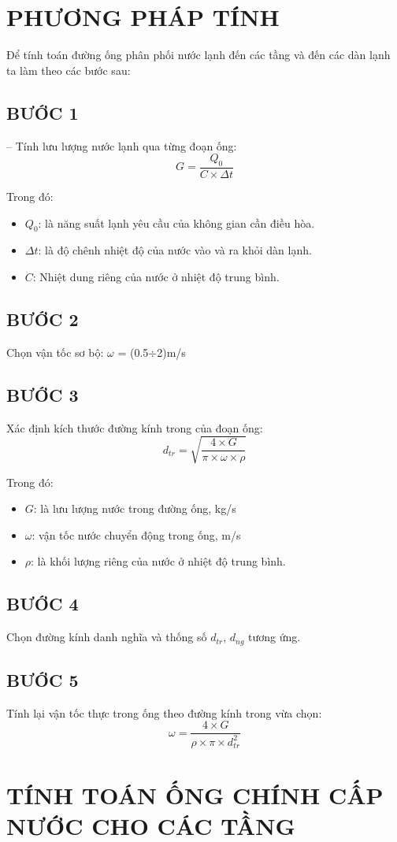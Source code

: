 \section{PHƯƠNG PHÁP TÍNH}
Để tính toán đường ống phân phối nước lạnh đến các tầng và đến các dàn lạnh ta làm theo các bước sau:
\subsection{BƯỚC 1}
-- Tính lưu lượng nước lạnh qua từng đoạn ống:
\begin{equation*}
	G = \dfrac{Q_{0}}{C\times\Delta t}
\end{equation*}

Trong đó:
\begin{itemize}
	\item $Q_{0}$: là năng suất lạnh yêu cầu của không gian cần điều hòa.
	\item $\Delta t$:  là độ chênh nhiệt độ của nước vào và ra khỏi dàn lạnh.
	\item $C$: Nhiệt dung riêng của nước ở nhiệt độ trung bình. 
\end{itemize}

\subsection{BƯỚC 2}
Chọn vận tốc sơ bộ: $\omega$ = (0.5$\div$2)m/s

\subsection{BƯỚC 3}
Xác định kích thước đường kính trong của đoạn ống:
\begin{equation*}
	d_{tr} = \sqrt{\dfrac{4\times G}{\pi\times\omega\times\rho}}
\end{equation*}

Trong đó:
\begin{itemize}
	\item $G$: là lưu lượng nước trong đường ống, kg/s
	\item $\omega$: vận tốc nước chuyển động trong ống, m/s
	\item $\rho$: là khối lượng riêng của nước ở nhiệt độ trung bình.
\end{itemize}

\subsection{BƯỚC 4}
Chọn đường kính danh nghĩa và thống số $d_{tr}$, $d_{ng}$ tương ứng.

\subsection{BƯỚC 5}
Tính lại vận tốc thực trong ống theo đường kính trong vừa chọn:
\begin{equation*}
	\omega = \dfrac{4\times G}{\rho\times\pi\times d_{tr}^2}
\end{equation*}

\section{TÍNH TOÁN ỐNG CHÍNH CẤP NƯỚC CHO CÁC TẦNG}

